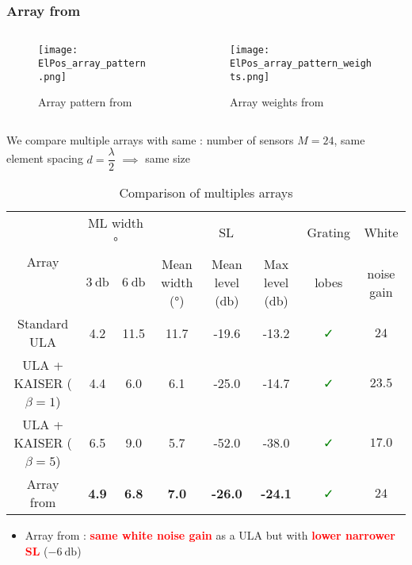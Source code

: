 \documentclass[UKenglish,8pt,aspectratio=1610]{beamer}
\begin{document}
\begin{frame}
	\frametitle{Array from \cite{Nonuniformly_spaced_linear} }
	\begin{columns}
	
	\begin{column}{0.5\textwidth}
		\vspace{-15pt}
		\begin{figure}
			\texttt{[image: ElPos\_array\_pattern.png]}
			\centering
				\vspace{-15pt}
			\caption{Array pattern from \cite{Nonuniformly_spaced_linear}}
		\end{figure}
	
		
	\end{column}
	
	\begin{column}{0.5\textwidth}
		\vspace{-15pt}
		\begin{figure}
			\texttt{[image: ElPos\_array\_pattern\_weights.png]}
			\centering	
			\vspace{-5pt}
			\caption{Array weights from \cite{Nonuniformly_spaced_linear}}
		\end{figure}
		
	\end{column}
\end{columns}
\vspace{-5pt}
We compare multiple arrays with same : number of sensors $M=24$, same element spacing $d=\dfrac{\lambda}{2}$ $\implies$ same size
\vspace{-5pt}
	\begin{table}
	\begin{tabular}{cccccccc}
	\hline
	\multirow{2}{*}{Array}&\multicolumn{2}{c}{ML width \si{\degree}}&\multicolumn{3}{c}{SL}&Grating&White 
	\\
	&$3~\si{\decibel}$&$6~\si{\decibel}$&Mean width ($\si{\degree}$)&Mean level (\si{\decibel})&Max level (\si{\decibel})&lobes&noise gain
	\\
	\hline
	\hline
	Standard ULA&4.2&11.5&11.7&-19.6&-13.2&\textcolor{green}{\faCheck}&$24$
	\\
	ULA + \textsc{KAISER} ($\beta=1$)&4.4&6.0&6.1&-25.0&-14.7&\textcolor{green}{\faCheck}&$23.5$
	\\
	ULA + \textsc{KAISER} ($\beta=5$)&6.5&9.0&5.7&-52.0&-38.0&\textcolor{green}{\faCheck}&$17.0$
	\\
	Array from \cite{Nonuniformly_spaced_linear}&\textbf{4.9}&\textbf{6.8}&\textbf{7.0}&\textbf{-26.0}&\textbf{-24.1}&\textcolor{green}{\faCheck}&$24$
	\\
	\hline
	\end{tabular}
	\caption{Comparison of multiples arrays}
		\centering
\end{table}
\begin{itemize}
	\item Array from \cite{Nonuniformly_spaced_linear} : \textcolor{red}{\textbf{same white noise gain}} as a ULA but with \textcolor{red}{\textbf{lower narrower SL}} ($-6~\si{\decibel}$)
\end{itemize}
\end{frame}
\end{document}
